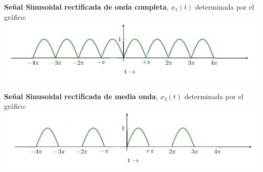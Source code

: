 \documentclass[12pt,a4paper]{report}
\begin{document}
\textbf{Señal Sinusoidal rectificada de onda completa}, $x_1(t)$ determinada por el gráfico:
\includegraphics[width=\textwidth]{images/ej2.a.png}

\textbf{Señal Sinusoidal rectificada de media onda}, $x_2(t)$ determinada por el gráfico:
\includegraphics[width=\textwidth]{images/ej2.b.png}
\end{document}
